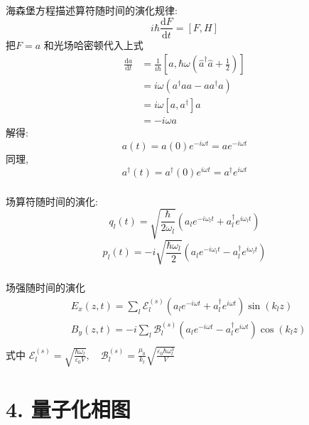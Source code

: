 \begin{frame}
 \frametitle{}
 {\Bullet}海森堡方程描述算符随时间的演化规律:
 \[ i\hbar\frac{\mathrm{d}F}{\mathrm{d}t} = [F,H] \]
 把$F= a $ 和光场哈密顿代入上式
 \[ \begin{aligned}
   \frac{\mathrm{d}a}{\mathrm{d}t} & =  \frac{1}{i \hbar} \left[a, \hbar \omega \left(\hat{a}^\dagger \hat{a} + \frac{1 }{2}\right)\right] \\
   &= i \omega (a^{\dagger} a a - a a^{\dagger}a)\\
   &= i \omega [a , a^{\dagger}] a \\ 
   &= - i \omega a
 \end{aligned}\] 
解得:
 \[ a(t)=a(0) e^{-i \omega t} = a e^{-i \omega t} \]  
同理,  
 \[ a ^\dagger(t)=a ^\dagger(0) e^{i \omega t} = a ^\dagger e^{i \omega t}\]  
\end{frame}

\begin{frame}
 \frametitle{}
 场算符随时间的演化:
\[ q_{l}(t)=\sqrt{\frac{\hbar}{2 \omega_{l}}}\left(a_{l} e^{-i \omega_{l} t}+a_{l}^{\dagger} e^{i \omega_{l} t}\right) \]
\[ p_{l}(t)=- i\sqrt{\frac{ \hbar \omega_{l}}{2}}\left(a_{l} e^{-i \omega_{l} t}-a_{l}^{\dagger} e^{i \omega_{l} t}\right) \]   
\end{frame}

\begin{frame}
 \frametitle{}
  场强随时间的演化 
  \[ 
    \begin{aligned}
      &E_{x}(z, t)=\sum_{l} \mathcal{E}_{l}^{(s)}\left(a_{l} e^{-i \omega t}+a_{l}^{\dagger} e^{i \omega t}\right) \sin \left(k_{l} z\right)  \\ 
      &B_{y}(z, t)=-i \sum_{l} \mathcal{B}_{l}^{(s)}\left(a_{l} e^{-i \omega t}-a_{l}^{\dagger} e^{i \omega t}\right) \cos \left(k_{l} z\right)  \\   
    \end{aligned} 
  \]
式中 $\mathcal{E}_{l}^{(s)}=\sqrt{\frac{\hbar \omega_{l}}{\varepsilon_{0} V}}, \quad
\mathcal{B}_{l}^{(s)}=\frac{\mu_0}{k_l}\sqrt{\frac{\varepsilon_{0}\hbar \omega_{l} ^3}{V}}$
\end{frame}

\section{4. 量子化相图}


